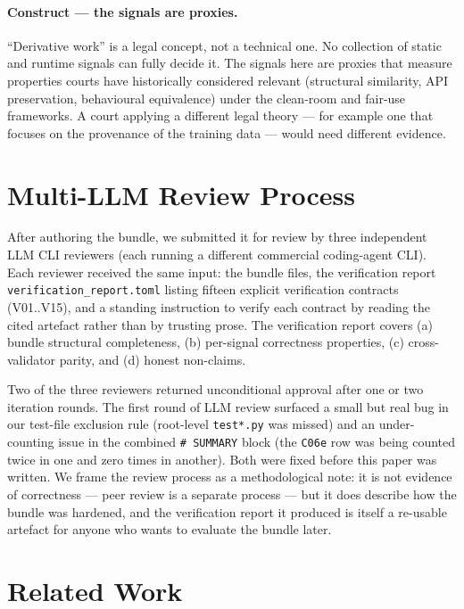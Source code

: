 \documentclass[11pt,letterpaper]{article}
\begin{document}
\paragraph{Construct --- the signals are proxies.} ``Derivative work''
is a legal concept, not a technical one. No collection of static and
runtime signals can fully decide it. The signals here are proxies
that measure properties courts have historically considered relevant
(structural similarity, API preservation, behavioural equivalence)
under the clean-room and fair-use frameworks. A court applying a
different legal theory --- for example one that focuses on the
provenance of the training data --- would need different evidence.

\section{Multi-LLM Review Process}
\label{sec:llm-review}

After authoring the bundle, we submitted it for review by three
independent LLM CLI reviewers (each running a different commercial
coding-agent CLI). Each reviewer received the same input: the bundle
files, the verification report \texttt{verification\_report.toml}
listing fifteen explicit verification contracts (V01..V15), and a
standing instruction to verify each contract by reading the cited
artefact rather than by trusting prose. The verification report
covers (a) bundle structural completeness, (b) per-signal correctness
properties, (c) cross-validator parity, and (d) honest non-claims.

Two of the three reviewers returned unconditional approval after one
or two iteration rounds. The first round of LLM review surfaced a
small but real bug in our test-file exclusion rule (root-level
\texttt{test*.py} was missed) and an under-counting issue in the
combined \texttt{\# SUMMARY} block (the \texttt{C06e} row was being
counted twice in one and zero times in another). Both were fixed
before this paper was written. We frame the review process as a
methodological note: it is not evidence of correctness --- peer
review is a separate process --- but it does describe how the
bundle was hardened, and the verification report it produced is
itself a re-usable artefact for anyone who wants to evaluate the
bundle later.

\section{Related Work}
\label{sec:related}
\end{document}
